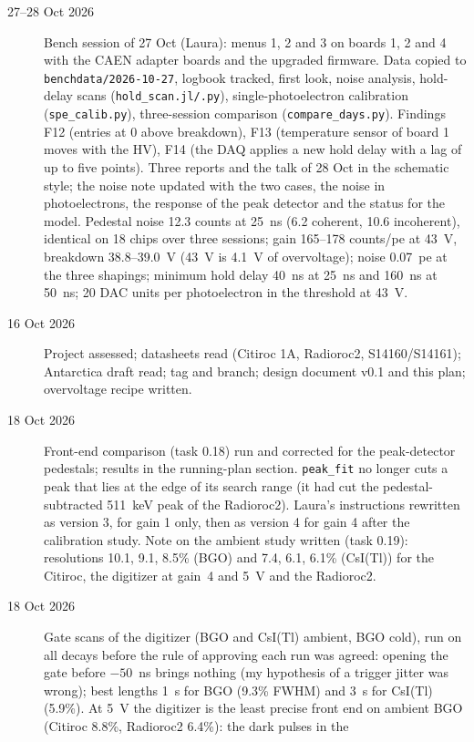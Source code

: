 \documentclass[11pt]{article}
\newcommand{\code}[1]{\texttt{#1}}
\newcommand{\us}{\textmu s\xspace}
\newcommand{\csitl}{CsI(Tl)\xspace}
\begin{document}
\begin{description}
\item[27--28 Oct 2026] Bench session of 27 Oct (Laura): menus 1, 2 and 3 on boards 1, 2
  and 4 with the CAEN adapter boards and the upgraded firmware. Data copied to
  \code{benchdata/2026-10-27}, logbook tracked, first look, noise analysis, hold-delay scans
  (\code{hold\_scan.jl/.py}), single-photoelectron calibration (\code{spe\_calib.py}),
  three-session comparison (\code{compare\_days.py}). Findings F12 (entries at 0 above
  breakdown), F13 (temperature sensor of board 1 moves with the HV), F14 (the DAQ applies a
  new hold delay with a lag of up to five points). Three reports and the talk of 28 Oct in
  the schematic style; the noise note updated with the two cases, the noise in
  photoelectrons, the response of the peak detector and the status for the model.
  Pedestal noise 12.3 counts at 25~ns (6.2 coherent, 10.6 incoherent), identical on 18 chips
  over three sessions; gain 165--178 counts/pe at 43~V, breakdown 38.8--39.0~V (43~V is 4.1~V
  of overvoltage); noise 0.07~pe at the three shapings; minimum hold delay 40~ns at 25~ns and
  160~ns at 50~ns; 20 DAC units per photoelectron in the threshold at 43~V.
\item[16 Oct 2026] Project assessed; datasheets read (Citiroc 1A, Radioroc2,
  S14160/S14161); Antarctica draft read; tag and branch; design document
  v0.1 and this plan; overvoltage recipe written.
\item[18 Oct 2026] Front-end comparison (task 0.18) run and corrected for
  the peak-detector pedestals; results in the running-plan section.
  \code{peak\_fit} no longer cuts a peak that lies at the edge of its search
  range (it had cut the pedestal-subtracted 511~keV peak of the
  Radioroc2). Laura's instructions rewritten as version 3, for gain 1 only, then as
  version 4 for gain 4 after the calibration study. Note on the ambient
  study written (task 0.19): resolutions 10.1, 9.1, 8.5\% (BGO) and 7.4,
  6.1, 6.1\% (\csitl) for the Citiroc, the digitizer at gain~4 and 5~V and
  the Radioroc2.
\item[18 Oct 2026] Gate scans of the digitizer (BGO and \csitl ambient,
  BGO cold), run on all decays before the rule of approving each run was
  agreed: opening the gate before $-50$~ns brings nothing (my hypothesis of a
  trigger jitter was wrong); best lengths 1~\us for BGO (9.3\% FWHM) and
  3~\us for \csitl (5.9\%). At 5~V the digitizer is the least precise front
  end on ambient BGO (Citiroc 8.8\%, Radioroc2 6.4\%): the dark pulses in the

\end{description}
\end{document}
